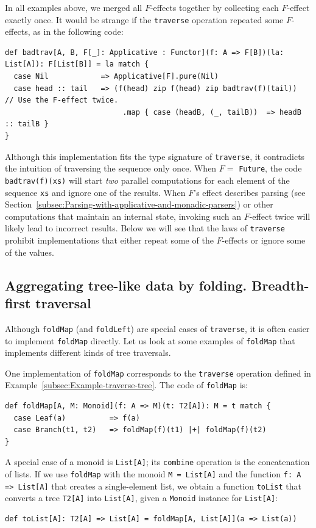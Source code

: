 In all examples above, we merged all $F$-effects together by collecting
each $F$-effect exactly once. It would be strange if the \lstinline!traverse!
operation repeated some $F$-effects, as in the following code:
\begin{lstlisting}
def badtrav[A, B, F[_]: Applicative : Functor](f: A => F[B])(la: List[A]): F[List[B]] = la match {
  case Nil            => Applicative[F].pure(Nil)
  case head :: tail   => (f(head) zip f(head) zip badtrav(f)(tail))     // Use the F-effect twice.
                           .map { case (headB, (_, tailB))  => headB :: tailB }
}
\end{lstlisting}
Although this implementation fits the type signature of \lstinline!traverse!,
it contradicts the intuition of traversing the sequence only once.
When $F=$ \lstinline!Future!, the code \lstinline!badtrav(f)(xs)!
will start \emph{two} parallel computations for each element of the
sequence \lstinline!xs! and ignore one of the results. When $F$\textsf{'}s
effect describes parsing (see Section~\ref{subsec:Parsing-with-applicative-and-monadic-parsers})
or other computations that maintain an internal state, invoking such
an $F$-effect twice will likely lead to incorrect results. Below
we will see that the laws of \lstinline!traverse! prohibit implementations
that either repeat some of the $F$-effects or ignore some of the
values.

\subsection{Aggregating tree-like data by folding. Breadth-first traversal\label{subsec:Aggregating-tree-like-data-bfs}}

Although \lstinline!foldMap! (and \lstinline!foldLeft!) are special
cases of \lstinline!traverse!, it is often easier to implement \lstinline!foldMap!
directly. Let us look at some examples of \lstinline!foldMap! that
implements different kinds of tree traversals.

One implementation of \lstinline!foldMap! corresponds to the \lstinline!traverse!
operation defined in Example~\ref{subsec:Example-traverse-tree}.
The code of \lstinline!foldMap! is:
\begin{lstlisting}
def foldMap[A, M: Monoid](f: A => M)(t: T2[A]): M = t match {
  case Leaf(a)          => f(a)
  case Branch(t1, t2)   => foldMap(f)(t1) |+| foldMap(f)(t2)
}
\end{lstlisting}

A special case of a monoid is \lstinline!List[A]!; its \lstinline!combine!
operation is the concatenation of lists. If we use \lstinline!foldMap!
with the monoid \lstinline!M = List[A]! and the function \lstinline!f: A => List[A]!
that creates a single-element list, we obtain a function \lstinline!toList!
that converts a tree \lstinline!T2[A]! into \lstinline!List[A]!,
given a \lstinline!Monoid! instance for \lstinline!List[A]!:
\begin{lstlisting}
def toList[A]: T2[A] => List[A] = foldMap[A, List[A]](a => List(a))
\end{lstlisting}

